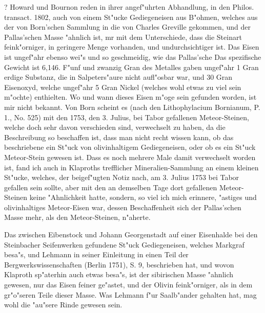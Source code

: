 \documentclass[a4paper, 11pt, oneside, polutonikogreek, german]{article}
\begin{document}
? Howard und Bournon reden in ihrer angef"uhrten Abhandlung, in den Philos. transact. 1802, auch von einem St"ucke Gediegeneisen aus B"ohmen, welches aus der von Born'schen Sammlung in die von Charles Greville gekommen, und der Pallas'schen Masse "ahnlich ist, mr mit dem Unterschiede, dass die Steinart feink"orniger, in geringere Menge vorhanden, und undurchsichtiger ist. Das Eisen ist ungef"ahr ebenso wei"s und so geschmeidig, wie das Pallas'sche Das spezifische Gewicht ist 6,146. F"unf und zwanzig Gran des Metalles gaben ungef"ahr 1 Gran erdige Substanz, die in Salpeters"aure nicht aufl"osbar war, und 30 Gran Eisenoxyd, welche ungef"ahr 5 Gran Nickel (welches wohl etwas zu viel sein m"ochte) enthielten. Wo und wann dieses Eisen m"oge sein gefunden worden, ist mir nicht bekannt. Von Born scheint es (nach den Lithophylacium Bornianum, P. 1., No. 525) mit den 1753, den 3. Julius, bei Tabor gefallenen Meteor-Steinen, welche doch sehr davon verschieden sind, verwechselt zu haben, da die Beschreibung so beschaffen ist, dass man nicht recht wissen kann, ob das beschriebene ein St"uck von olivinhaltigem Gediegeneisen, oder ob es ein St"uck Meteor-Stein gewesen ist. Dass es noch mehrere Male damit verwechselt worden ist, fand ich auch in Klaproths trefflicher Mineralien-Sammlung an einem kleinen St"ucke, welches, der beigef"ugten Notiz nach, am 3. Julius 1753 bei Tabor gefallen sein sollte, aber mit den an demselben Tage dort gefallenen Meteor-Steinen keine "Ahnlichkeit hatte, sondern, so viel ich mich erinnere, "astiges und olivinhaltiges Meteor-Eisen war, dessen Beschaffenheit sich der Pallas'schen Masse mehr, als den Meteor-Steinen, n"aherte.

Das zwischen Eibenstock und Johann Georgenstadt auf einer Eisenhalde bei den Steinbacher Seifenwerken gefundene St"uck Gediegeneisen, welches Markgraf besa"s, und Lehmann in seiner Einleitung in einen Teil der Bergwerkswissenschaften (Berlin 1751), S. 9, beschrieben hat, und wovon Klaproth sp"aterhin auch etwas besa"s, ist der sibirischen Masse "ahnlich gewesen, nur das Eisen feiner ge"astet, und der Olivin feink"orniger, als in dem gr"o"seren Teile dieser Masse. Was Lehmann f"ur Saalb"ander gehalten hat, mag wohl die "au"sere Rinde gewesen sein.
\end{document}

